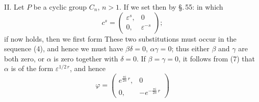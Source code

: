 II. Let $P$ be a cyclic group $C_n$, $n > 1$.
If we set
then by \S.\,55:
in which
\[
c^s = \begin{pmatrix} \varepsilon^s, & 0 \\ 0, & \varepsilon^{-s} \end{pmatrix};
\]
if now
holds, then we first form
These two substitutions must occur in the sequence (4), and hence we must have $\beta\delta = 0$, $\alpha\gamma = 0$; thus either $\beta$ and $\gamma$ are both zero, or $\alpha$ is zero together with $\delta = 0$. If $\beta = \gamma = 0$, it follows from (7) that $\alpha$ is of the form $\varepsilon^{1/2\,r}$, and hence
\[
\varphi = \begin{pmatrix} e^{\frac{\pi i}{2n}\,r}, & 0 \\ 0, & -e^{-\frac{\pi i}{2n}\,r} \end{pmatrix}
\]

